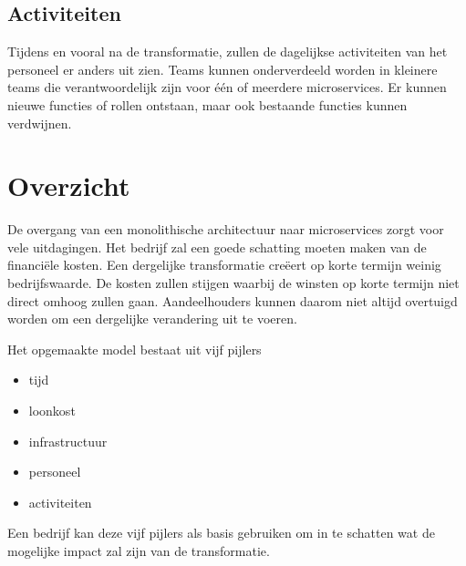 \subsection{Activiteiten}

Tijdens en vooral na de transformatie, zullen de dagelijkse activiteiten van het personeel er anders uit zien. Teams kunnen onderverdeeld worden in kleinere teams die verantwoordelijk zijn voor één of meerdere microservices. Er kunnen nieuwe functies of rollen ontstaan, maar ook bestaande functies kunnen verdwijnen.  

\section{Overzicht}

De overgang van een monolithische architectuur naar microservices zorgt voor vele uitdagingen. Het bedrijf zal een goede schatting moeten maken van de financiële kosten. Een dergelijke transformatie creëert op korte termijn weinig bedrijfswaarde. De kosten zullen stijgen waarbij de winsten op korte termijn niet direct omhoog zullen gaan. Aandeelhouders kunnen daarom niet altijd overtuigd worden om een dergelijke verandering uit te voeren.

Het opgemaakte model bestaat uit vijf pijlers
\begin{itemize}
    \item tijd
    \item loonkost
    \item infrastructuur
    \item personeel
    \item activiteiten
\end{itemize}

Een bedrijf kan deze vijf pijlers als basis gebruiken om in te schatten wat de mogelijke impact zal zijn van de transformatie.

